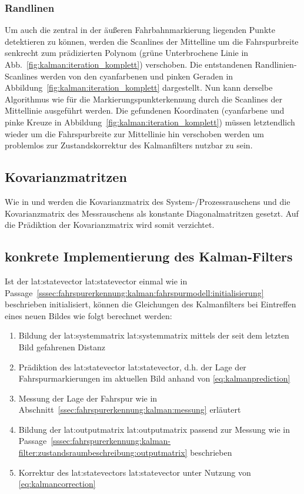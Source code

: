 \subsubsection{Randlinen}
Um auch die zentral in der äußeren Fahrbahnmarkierung liegenden Punkte detektieren zu können, werden die Scanlines der Mittelline um die Fahrspurbreite senkrecht zum prädizierten Polynom (grüne Unterbrochene Linie in Abb.~\ref{fig:kalman:iteration_komplett}) verschoben. Die entstandenen Randlinien-Scanlines werden von den cyanfarbenen und pinken Geraden in Abbildung~\ref{fig:kalman:iteration_komplett} dargestellt. Nun kann derselbe Algorithmus wie für die Markierungspunkterkennung durch die Scanlines der Mittellinie ausgeführt werden. Die gefundenen Koordinaten (cyanfarbene und pinke Kreuze in Abbildung~\ref{fig:kalman:iteration_komplett}) müssen letztendlich wieder um die Fahrspurbreite zur Mittellinie hin verschoben werden um problemlos zur Zustandskorrektur des Kalmanfilters nutzbar zu sein.

\subsection{Kovarianzmatritzen}
\label{ssec:polynombasierte:kalman:kovarianzmatritzen}
Wie in \autocite{petersfalkoFPGAbasierteBildverarbeitungspipelineZur2009} und \autocite{risackRobustLaneRecognition1998} werden die Kovarianzmatrix des System-/Prozessrauschens  und die Kovarianzmatrix des Messrauschens  als konstante Diagonalmatritzen gesetzt. Auf die Prädiktion der Kovarianzmatrix  wird somit verzichtet.

\subsection{konkrete Implementierung des Kalman-Filters}
\label{ssec:polynombasierte:kalman:implementierung}
Ist der \glsdesc{lat:statevector} \gls{lat:statevector} einmal wie in Passage~\ref{sssec:fahrspurerkennung:kalman:fahrspurmodell:initialisierung} beschrieben initialisiert, können die Gleichungen des Kalmanfilters bei Eintreffen eines neuen Bildes wie folgt berechnet werden:
\begin{enumerate}
\item Bildung der \glsdesc{lat:systemmatrix} \gls{lat:systemmatrix} mittels der seit dem letzten Bild gefahrenen Distanz 
\item Prädiktion des \glsdesc{lat:statevector} \gls{lat:statevector}, d.h. der Lage der Fahrspurmarkierungen im aktuellen Bild anhand von \eqref{eq:kalmanprediction}
\item Messung der Lage der Fahrspur wie in Abschnitt~\ref{ssec:fahrspurerkennung:kalman:messung}
erläutert
\item Bildung der \glsdesc{lat:outputmatrix} \gls{lat:outputmatrix} passend zur Messung wie in Passage~\ref{sssec:fahrspurerkennung:kalman-filter:zustandsraumbeschreibung:outputmatrix} beschrieben
\item Korrektur des \glsdesc{lat:statevector}s \gls{lat:statevector} unter Nutzung von \eqref{eq:kalmancorrection}
\end{enumerate}

